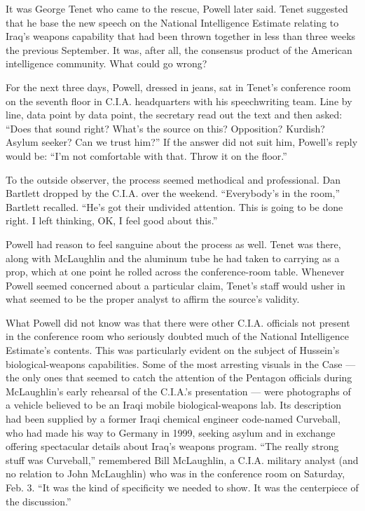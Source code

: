 It was George Tenet who came to the rescue, Powell later said. Tenet
suggested that he base the new speech on the National Intelligence
Estimate relating to Iraq's weapons capability that had been thrown
together in less than three weeks the previous September. It was, after
all, the consensus product of the American intelligence community. What
could go wrong?

For the next three days, Powell, dressed in jeans, sat in Tenet's
conference room on the seventh floor in C.I.A. headquarters with his
speechwriting team. Line by line, data point by data point, the
secretary read out the text and then asked: ``Does that sound right?
What's the source on this? Opposition? Kurdish? Asylum seeker? Can we
trust him?'' If the answer did not suit him, Powell's reply would be:
``I'm not comfortable with that. Throw it on the floor.''

To the outside observer, the process seemed methodical and professional.
Dan Bartlett dropped by the C.I.A. over the weekend. ``Everybody's in
the room,'' Bartlett recalled. ``He's got their undivided attention.
This is going to be done right. I left thinking, OK, I feel good about
this.''

Powell had reason to feel sanguine about the process as well. Tenet was
there, along with McLaughlin and the aluminum tube he had taken to
carrying as a prop, which at one point he rolled across the
conference-room table. Whenever Powell seemed concerned about a
particular claim, Tenet's staff would usher in what seemed to be the
proper analyst to affirm the source's validity.

What Powell did not know was that there were other C.I.A. officials not
present in the conference room who seriously doubted much of the
National Intelligence Estimate's contents. This was particularly evident
on the subject of Hussein's biological-weapons capabilities. Some of the
most arresting visuals in the Case --- the only ones that seemed to
catch the attention of the Pentagon officials during McLaughlin's early
rehearsal of the C.I.A.'s presentation --- were photographs of a vehicle
believed to be an Iraqi mobile biological-weapons lab. Its description
had been supplied by a former Iraqi chemical engineer code-named
Curveball, who had made his way to Germany in 1999, seeking asylum and
in exchange offering spectacular details about Iraq's weapons program.
``The really strong stuff was Curveball,'' remembered Bill McLaughlin, a
C.I.A. military analyst (and no relation to John McLaughlin) who was in
the conference room on Saturday, Feb. 3. ``It was the kind of
specificity we needed to show. It was the centerpiece of the
discussion.''

